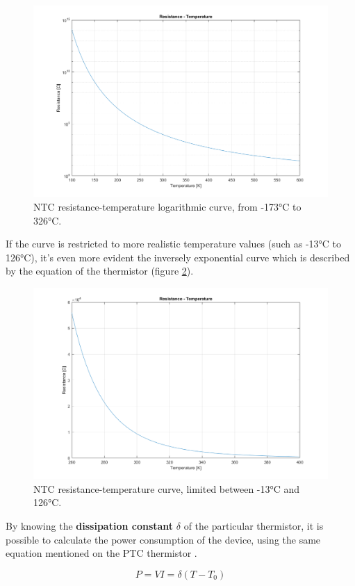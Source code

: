 \begin{figure}[h]
    \centering
    \includegraphics[width = .75\textwidth]{../res/plots/NTC_logarithmic.png}
    \caption{NTC resistance-temperature logarithmic curve, from -173°C to 326°C.}
    \label{fig:NTC_logarithmic}
\end{figure}

\FloatBarrier\noindent If the curve is restricted to more realistic temperature values (such as -13°C to 126°C), it's even more evident the inversely exponential curve which is described by the equation of the thermistor (figure \ref{fig:NTC_cartesian}).

\begin{figure}[h]
    \centering
    \includegraphics[width = .75\textwidth]{../res/plots/NTC_cartesian.png}
    \caption{NTC resistance-temperature curve, limited between -13°C and 126°C.}
    \label{fig:NTC_cartesian}
\end{figure}

\FloatBarrier\noindent By knowing the \textbf{dissipation constant} $\delta$ of the particular thermistor, it is possible to calculate the power consumption of the device, using the same equation mentioned on the PTC thermistor \cite{Jagtap201182}\cite{Keskin2005244}.

\begin{equation*}
    P = VI = \delta(T - T_0)
\end{equation*}

